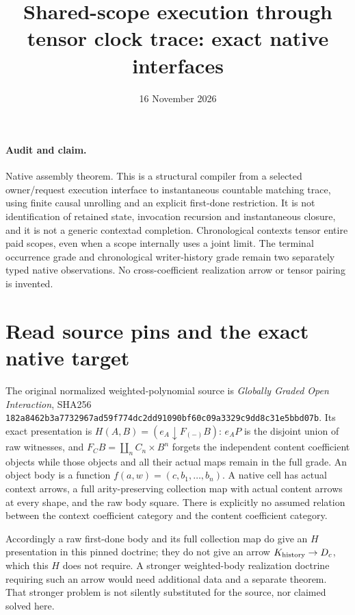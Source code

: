 \documentclass[11pt]{article}\usepackage{amsmath,amssymb,amsthm,geometry}\geometry{margin=1in}\newtheorem{definition}{Definition}\newtheorem{theorem}[definition]{Theorem}\newtheorem{proposition}[definition]{Proposition}
\title{Shared-scope execution through tensor clock trace: exact native interfaces}\date{16 November 2026}
\begin{document}
\maketitle
\paragraph{Audit and claim.} Native assembly theorem. This is a structural compiler from a selected owner/request execution interface to instantaneous countable matching trace, using finite causal unrolling and an explicit first-done restriction. It is not identification of retained state, invocation recursion and instantaneous closure, and it is not a generic contextad completion. Chronological contexts tensor entire paid scopes, even when a scope internally uses a joint limit. The terminal occurrence grade and chronological writer-history grade remain two separately typed native observations. No cross-coefficient realization arrow or tensor pairing is invented.

\section{Read source pins and the exact native target}
The original normalized weighted-polynomial source is \emph{Globally Graded Open Interaction}, SHA256
\texttt{182a8462b3a7732967ad59f774dc2dd91090bf60c09a3329c9dd8c31e5bbd07b}.
Its exact presentation is $H(A,B)=(e_A\downarrow F_{(-)}B)$: $e_AP$ is the disjoint union of raw witnesses, and $F_CB=\coprod_nC_n\times B^n$ forgets the independent content coefficient objects while those objects and all their actual maps remain in the full grade. An object body is a function $f(a,w)=(c,b_1,\ldots,b_n)$. A native cell has actual context arrows, a full arity-preserving collection map with actual content arrows at every shape, and the raw body square. There is explicitly no assumed relation between the context coefficient category and the content coefficient category.

Accordingly a raw first-done body and its full collection map do give an $H$ presentation in this pinned doctrine; they do not give an arrow $K_{\rm history}\to D_c$, which this $H$ does not require. A stronger weighted-body realization doctrine requiring such an arrow would need additional data and a separate theorem. That stronger problem is not silently substituted for the source, nor claimed solved here.
\end{document}
